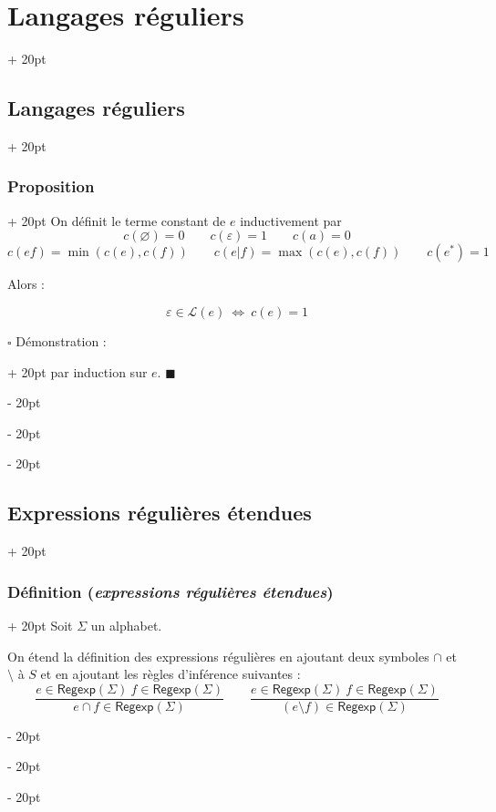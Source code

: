 \documentclass[a4paper, 12pt, twoside]{article}
\newcommand{\ssi}{\ \Leftrightarrow \ }
\newcommand{\ind}[1][20pt]{\advance\leftskip + #1}
\newcommand{\deind}[1][20pt]{\advance\leftskip - #1}
\newenvironment{indt}[2][20pt]{#2 \par \ind[#1]}{\par \deind} %
\newenvironment{proof}[1][{Démonstration :}]{\begin{indt}{$\square$ #1}}{$\blacksquare$ \end{indt}}
\newcommand{\Regexp}{\mathsf{Regexp}}
\begin{document}
\begin{indt}{\section{Langages réguliers}}
\begin{indt}{\subsection{Langages réguliers}}
\begin{indt}{\subsubsection{Proposition}}
                On définit le terme constant de $e$ inductivement par
                \[
                    c(\varnothing) = 0
                    \qquad
                    c(\varepsilon) = 1
                    \qquad
                    c(a) = 0
                \]
                \[
                    c(ef) = \min(c(e), c(f))
                    \qquad
                    c(e|f) = \max(c(e), c(f))
                    \qquad
                    c(e^*) = 1
                \]

                \vspace{6pt}
                
                Alors :
                \begin{emphBox}
                    \[
                        \varepsilon \in \mathcal L(e) \ssi c(e) = 1
                    \]
                \end{emphBox}

                \vspace{12pt}
                
                \begin{proof}
                     par induction sur $e$.
                \end{proof}
            \end{indt}
        \end{indt}

        \vspace{12pt}
        
        \begin{indt}{\subsection{Expressions régulières étendues}}
            \begin{indt}{\subsubsection{Définition (\textit{expressions régulières étendues})}}
                Soit $\Sigma$ un alphabet.

                On étend la définition des expressions régulières en ajoutant deux symboles $\cap$ et $\setminus$ à $S$ et en ajoutant les règles d'inférence suivantes :
                \[
                    \dfrac{e \in \Regexp(\Sigma)\ f \in \Regexp(\Sigma)}{e \cap f \in \Regexp(\Sigma)}
                    \qquad
                    \dfrac{e \in \Regexp(\Sigma)\ f \in \Regexp(\Sigma)}{(e \setminus f) \in \Regexp(\Sigma)}
                \]


\end{indt}
\end{indt}
\end{indt}
\end{document}
